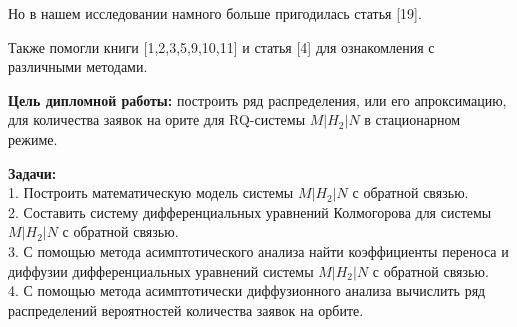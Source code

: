 Но в нашем исследовании намного больше пригодилась статья [19].

Также помогли книги [1,2,3,5,9,10,11] и статья [4] для ознакомления с различными методами.

\textbf{Цель дипломной работы:} построить ряд распределения, или его апроксимацию, для количества заявок на орите для RQ-системы $M|H_2|N$ в стационарном режиме.

\textbf{Задачи:}\\
1. Построить математическую модель системы $M|H_{2}|N$ с обратной связью.\\
2. Составить систему дифференциальных уравнений Колмогорова для системы $M|H_{2}|N$ с обратной связью.\\
3. С помощью метода асимптотического анализа найти коэффициенты переноса и диффузии дифференциальных уравнений системы  $M|H_{2}|N$ с обратной связью.\\
4. С помощью метода асимптотически диффузионного анализа вычислить ряд распределений вероятностей количества заявок на орбите.
